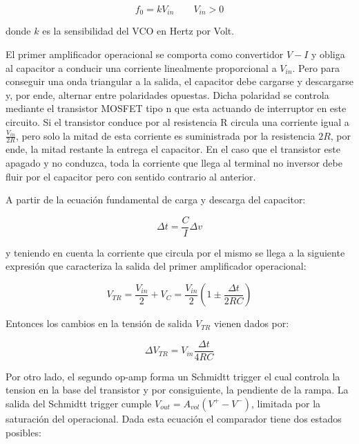 \begin{equation}
f_0 = kV_{in}  \qquad  V_{in} > 0
\end{equation}

donde $k$ es la sensibilidad del VCO en Hertz por Volt. \newline


El primer amplificador operacional se comporta como convertidor $V-I$ y obliga al capacitor a conducir una corriente linealmente proporcional a $V_{in}$. Pero para conseguir una onda triangular a la salida, el capacitor debe cargarse y descargarse y, por ende, alternar entre polaridades opuestas. Dicha polaridad se controla mediante el transistor MOSFET tipo n que esta actuando de interruptor en este circuito. Si el transistor conduce por al resistencia R circula una corriente igual a $\frac{V_{in}}{2R}$, pero solo la mitad de esta corriente es suministrada por la resistencia $2R$, por ende, la mitad restante la entrega el capacitor. En el caso que el transistor este apagado y no conduzca, toda la corriente que llega al terminal no inversor debe fluir por el capacitor pero con sentido contrario al anterior. 


A partir de la ecuación fundamental de carga y descarga del capacitor:

\begin{equation}
\Delta t = \frac{C}{I}\Delta v 
\end{equation}

y teniendo en cuenta la corriente que circula por el mismo se llega a la siguiente expresión que caracteriza la salida del primer amplificador operacional:

\begin{equation}\label{eq:rampa}
V_{TR} = \frac{V_{in}}{2} + V_C = \frac{V_{in}}{2}(1 \pm \frac{\Delta t}{2RC})
\end{equation}

Entonces los cambios en la tensión de salida $V_{TR}$ vienen dados por:

\begin{equation}
\Delta V_{TR	} = V_{in} \frac{\Delta t}{4RC}
\end{equation}

 

Por otro lado, el segundo op-amp forma un Schmidtt trigger el cual controla la tension en la base del transistor y por consiguiente, la pendiente de la rampa. La salida del Schmidtt trigger cumple $V_{out} = A_{vol}(V^{+} - V^{-})$, limitada por la saturación del operacional. Dada esta ecuación el comparador tiene dos estados posibles:

